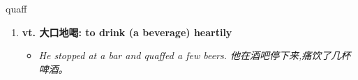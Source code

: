 
\begin{frame}
{\huge quaff}
\begin{center}
\begin{enumerate}\Large
  \item \textbf{vt. 大口地喝: to drink (a beverage) heartily}
  \begin{itemize}
    \item \em{\Large{He stopped at a bar and quaffed a few beers. 他在酒吧停下来,痛饮了几杯啤酒。}}
  \end{itemize}
\end{enumerate}
\end{center}
\end{frame}
